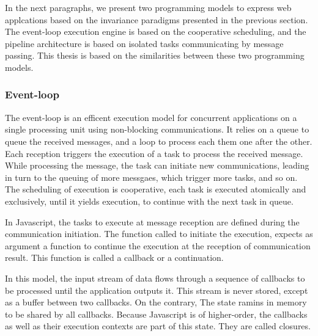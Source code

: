 In the next paragraphs, we present two programming models to express web applcations based on the invariance paradigms presented in the previous section.
The event-loop execution engine is based on the cooperative scheduling, and the pipeline architecture is based on isolated tasks communicating by message passing.
This thesis is based on the similarities between these two programming models.

\subsubsection{Event-loop}

The event-loop is an efficent execution model for concurrent applications on a single processing unit using non-blocking communications.
It relies on a queue to queue the received messages, and a loop to process each them one after the other.
Each reception triggers the execution of a task to process the received message.
While processing the message, the task can initiate new communications, leading in turn to the queuing of more messgaes, which trigger more tasks, and so on.
The scheduling of execution is cooperative, each task is executed atomically and exclusively, until it yields execution, to continue with the next task in queue.



In Javascript, the tasks to execute at message reception are defined during the communication initiation.
The function called to initiate the execution, expects as argument a function to continue the execution at the reception of communication result.
This function is called a callback or a continuation.

In this model, the input stream of data flows through a sequence of callbacks to be processed until the application outputs it.
This stream is never stored, except as a buffer between two callbacks.
On the contrary, The state ramins in memory to be shared by all callbacks.
Because Javascript is of higher-order, the callbacks as well as their execution contexts are part of this state.
They are called closures.


